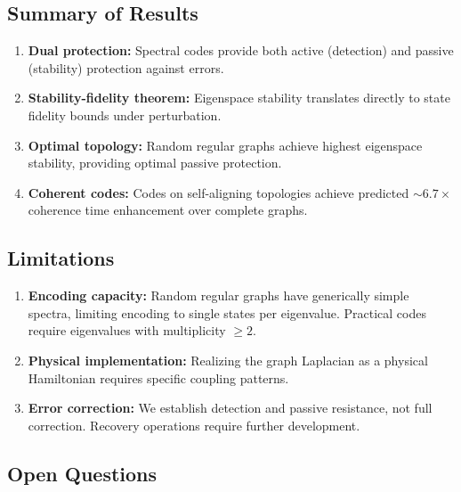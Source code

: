 \documentclass[11pt,a4paper]{article}
\theoremstyle{definition}
\begin{document}
\subsection{Summary of Results}

\begin{enumerate}
    \item \textbf{Dual protection:} Spectral codes provide both active (detection) and passive (stability) protection against errors.
    
    \item \textbf{Stability-fidelity theorem:} Eigenspace stability translates directly to state fidelity bounds under perturbation.
    
    \item \textbf{Optimal topology:} Random regular graphs achieve highest eigenspace stability, providing optimal passive protection.
    
    \item \textbf{Coherent codes:} Codes on self-aligning topologies achieve predicted $\sim 6.7\times$ coherence time enhancement over complete graphs.
\end{enumerate}

\subsection{Limitations}

\begin{enumerate}[noitemsep]
    \item \textbf{Encoding capacity:} Random regular graphs have generically simple spectra, limiting encoding to single states per eigenvalue. Practical codes require eigenvalues with multiplicity $\geq 2$.
    
    \item \textbf{Physical implementation:} Realizing the graph Laplacian as a physical Hamiltonian requires specific coupling patterns.
    
    \item \textbf{Error correction:} We establish detection and passive resistance, not full correction. Recovery operations require further development.
\end{enumerate}

\subsection{Open Questions}
\end{document}
